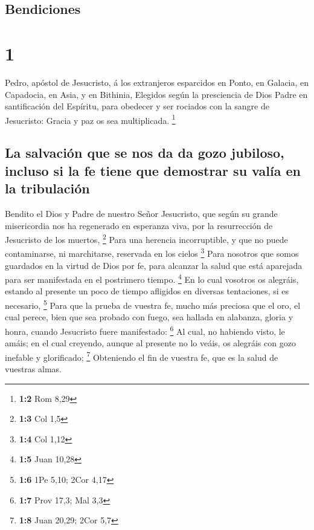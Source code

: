 \hypertarget{bendiciones}{%
\subsection{Bendiciones}\label{bendiciones}}

\hypertarget{section}{%
\section{1}\label{section}}

 Pedro, apóstol de Jesucristo, á los extranjeros esparcidos
en Ponto, en Galacia, en Capadocia, en Asia, y en Bithinia, 
Elegidos según la presciencia de Dios Padre en santificación del
Espíritu, para obedecer y ser rociados con la sangre de Jesucristo:
Gracia y paz os sea multiplicada. \footnote{\textbf{1:2} Rom 8,29}

\hypertarget{la-salvaciuxf3n-que-se-nos-da-da-gozo-jubiloso-incluso-si-la-fe-tiene-que-demostrar-su-valuxeda-en-la-tribulaciuxf3n}{%
\subsection{La salvación que se nos da da gozo jubiloso, incluso si la
fe tiene que demostrar su valía en la
tribulación}\label{la-salvaciuxf3n-que-se-nos-da-da-gozo-jubiloso-incluso-si-la-fe-tiene-que-demostrar-su-valuxeda-en-la-tribulaciuxf3n}}

 Bendito el Dios y Padre de nuestro Señor Jesucristo, que
según su grande misericordia nos ha regenerado en esperanza viva, por la
resurrección de Jesucristo de los muertos, \footnote{\textbf{1:3} Col
  1,5}  Para una herencia incorruptible, y que no puede
contaminarse, ni marchitarse, reservada en los cielos \footnote{\textbf{1:4}
  Col 1,12}  Para nosotros que somos guardados en la virtud
de Dios por fe, para alcanzar la salud que está aparejada para ser
manifestada en el postrimero tiempo. \footnote{\textbf{1:5} Juan 10,28}
 En lo cual vosotros os alegráis, estando al presente un
poco de tiempo afligidos en diversas tentaciones, si es necesario,
\footnote{\textbf{1:6} 1Pe 5,10; 2Cor 4,17}  Para que la
prueba de vuestra fe, mucho más preciosa que el oro, el cual perece,
bien que sea probado con fuego, sea hallada en alabanza, gloria y honra,
cuando Jesucristo fuere manifestado: \footnote{\textbf{1:7} Prov 17,3;
  Mal 3,3}  Al cual, no habiendo visto, le amáis; en el cual
creyendo, aunque al presente no lo veáis, os alegráis con gozo inefable
y glorificado; \footnote{\textbf{1:8} Juan 20,29; 2Cor 5,7} 
Obteniendo el fin de vuestra fe, que es la salud de vuestras almas.

